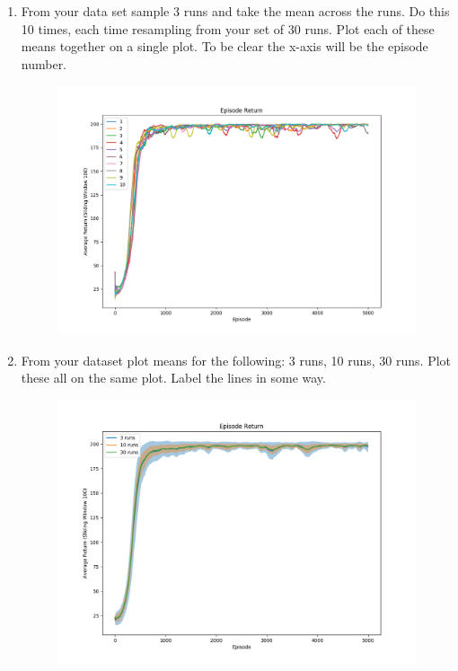 \documentclass{article}
\begin{document}
\begin{enumerate}
    \item From your data set sample 3 runs and take the mean across the runs. Do this 10 times, each time resampling from your set of 30 runs. Plot each of these means together on a single plot. To be clear the x-axis will be the episode number.
    
    \begin{figure}[H]
    	\begin{center}
    		\centerline{\includegraphics[scale=0.5]{img/mixture_of_mean.png}}
    	\end{center}
    \end{figure}
    
    \item From your dataset plot means for the following: 3 runs, 10 runs, 30 runs. Plot these all on the same plot. Label the lines in some way.
    
    \begin{figure}[H]
    	\begin{center}
    		\centerline{\includegraphics[scale=0.5]{img/mean_with_std.png}}
    	\end{center}
    \end{figure}
        
\end{enumerate}
\end{document}
